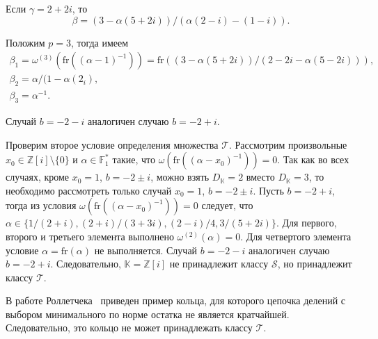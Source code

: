 \documentclass[_00_autoref.tex]{subfiles}
\begin{document}
\begin{example}
    Если $\gamma=2+2i$, то
    \begin{equation*}
        \beta=(3-\alpha(5+2i))/(\alpha(2-i)-(1-i)).
    \end{equation*}

    Положим $p=3$, тогда имеем
    \begin{equation*}
        \begin{array}{c}
            \beta_1=\omega^{(3)}(\textrm{fr}((\alpha-1)^{-1}))=\textrm{fr}((3-\alpha(5+2i))/(2-2i-\alpha(5-2i))),\\
            \beta_2=\alpha/(1-\alpha(2_i),\\
            \beta_3=\alpha^{-1}.
        \end{array}
    \end{equation*}

    Случай $b=-2-i$ аналогичен случаю $b=-2+i$.

    Проверим второе условие определения множества $\mathcal{T}$.
    Рассмотрим произвольные $x_0\in\mathbb{Z}[i]\setminus\{0\}$ и $\alpha\in\mathbb{F}^*_1$ такие, что $\omega(\textrm{fr}((\alpha-x_0)^{-1}))=0$.
    Так как во всех случаях, кроме $x_0=1$, $b=-2\pm i$, можно взять $D_{\mathbb{K}}=2$ вместо $D_{\mathbb{K}}=3$, то необходимо рассмотреть только случай $x_0=1$, $b=-2\pm i$.
    Пусть $b=-2+i$, тогда из условия $\omega(\textrm{fr}((\alpha-x_0)^{-1}))=0$ следует, что $\alpha\in\{1/(2+i),(2+i)/(3+3i),(2-i)/4,3/(5+2i)\}$.
    Для первого, второго и третьего элемента выполнено $\omega^{(2)}(\alpha)=0$.
    Для четвертого элемента условие $\alpha=\textrm{fr}(\alpha)$ не выполняется.
    Случай $b=-2-i$ аналогичен случаю $b=-2+i$.
    Следовательно, $\mathbb{K}=\mathbb{Z}[i]$ не принадлежит классу $\mathcal{S}$, но принадлежит классу $\mathcal{T}$.
\end{example}

В работе Роллетчека~\cite{source:Rolletschek_1990} приведен пример кольца, для которого цепочка делений с выбором минимального по норме остатка не является кратчайшей.
Следовательно, это кольцо не может принадлежать классу $\mathcal{T}$.
\end{document}
